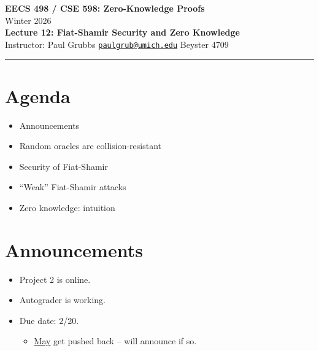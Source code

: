 \documentclass[11pt]{article}
\theoremstyle{plain}
\theoremstyle{definition}
\begin{document}
\begin{center}
  {\LARGE \textbf{EECS 498 / CSE 598: Zero-Knowledge Proofs}}\\[6pt]
  {\large Winter 2026}\\[4pt]
  {\large \textbf{Lecture 12: Fiat-Shamir Security and Zero Knowledge}}\\[4pt]
  {\large Instructor: Paul Grubbs \quad
    \href{mailto:paulgrub@umich.edu}{\texttt{paulgrub@umich.edu}} \quad
    Beyster 4709}
\end{center}

\vspace{0.5em}
\hrule
\vspace{1em}

\section*{Agenda}
\begin{itemize}
  \item Announcements
  \item Random oracles are collision-resistant
  \item Security of Fiat-Shamir
  \item ``Weak'' Fiat-Shamir attacks
  \item Zero knowledge: intuition
\end{itemize}

\newpage

\section{Announcements}

\begin{itemize}
  \item Project 2 is online.
  \item Autograder is working.
  \item Due date: 2/20.
        \begin{itemize}
          \item \underline{May} get pushed back -- will announce if so.
        \end{itemize}
\end{itemize}
\end{document}

